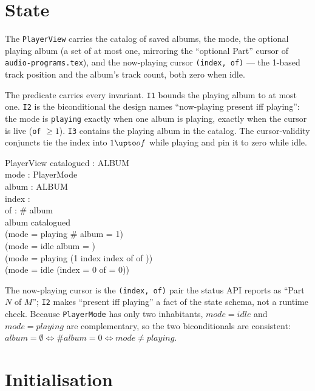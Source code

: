\documentclass[a4paper,10pt,fleqn]{article}
\begin{document}
\section{State}
\label{sec:state}

The \texttt{PlayerView} carries the catalog of saved albums, the mode, the
optional playing album (a set of at most one, mirroring the ``optional Part''
cursor of \texttt{audio-programs.tex}), and the now-playing cursor
\texttt{(index, of)} --- the 1-based track position and the album's track count,
both zero when idle.

The predicate carries every invariant. \texttt{I1} bounds the playing album to
at most one. \texttt{I2} is the biconditional the design names ``now-playing
present iff playing'': the mode is \texttt{playing} exactly when one album is
playing, exactly when the cursor is live (\texttt{of} $\geq 1$). \texttt{I3}
contains the playing album in the catalog. The cursor-validity conjuncts tie the
index into $1 \upto of$ while playing and pin it to zero while idle.

\begin{schema}{PlayerView}
  catalogued : \power ALBUM \\
  mode : PlayerMode \\
  album : \power ALBUM \\
  index : \nat \\
  of : \nat
  \where
  \# album  \\
  album \subseteq catalogued \\
  (mode = playing \iff \# album = 1) \\
  (mode = idle \iff album = \emptyset) \\
  (mode = playing \implies (1 \leq index \land index \leq of \land of )) \\
  (mode = idle \implies (index = 0 \land of = 0))
\end{schema}

The now-playing cursor is the \texttt{(index, of)} pair the status API reports as
``Part $N$ of $M$''; \texttt{I2} makes ``present iff playing'' a fact of the state
schema, not a runtime check. Because \texttt{PlayerMode} has only two
inhabitants, $mode = idle$ and $mode = playing$ are complementary, so the two
biconditionals are consistent: $album = \emptyset \iff \# album = 0 \iff mode
\neq playing$.

\section{Initialisation}
\end{document}
